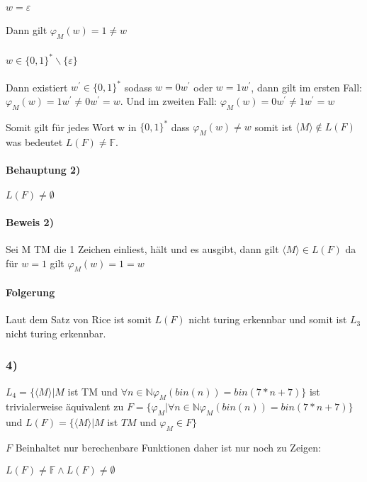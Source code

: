 \paragraph*{$w=\varepsilon$}
Dann gilt $\varphi_M(w)=1\neq w$ 
\paragraph*{$w \in \{0,1\}^* \backslash \{ \varepsilon \} $}
Dann existiert $w^{\prime} \in  \{0,1\}^*$ sodass $w=0w^{\prime}$ oder $w=1w^{\prime}$, dann gilt im ersten Fall: $\varphi_M(w)=1w^{\prime} \neq 0w^{\prime}=w$. Und im zweiten Fall: $\varphi_M(w)=0w^{\prime} \neq 1w^{\prime}=w$

Somit gilt für jedes Wort w in $\{0,1\}^*$ dass $\varphi_M(w) \neq w$ somit ist  $\langle M \rangle \notin L(F)$ was bedeutet $L(F) \neq \mathbb{F}$.

\paragraph*{Behauptung 2)}
$L(F) \neq \emptyset$

\paragraph*{Beweis 2)}

Sei M TM die 1 Zeichen einliest, hält und es ausgibt, dann gilt $\langle M \rangle \in L(F)$ da für $w=1$ gilt $\varphi_M(w)=1=w$

\paragraph*{Folgerung}

Laut dem Satz von Rice ist somit $L(F)$ nicht turing erkennbar und somit ist $L_3$ nicht turing erkennbar.


\subsubsection*{4)}
$L_4=\{\langle M \rangle | M$ ist TM und $\forall n \in \mathbb{N} \varphi_M(bin(n))=bin(7*n+7)\}$ ist trivialerweise äquivalent zu $F = \{ \varphi_M | \forall n \in \mathbb{N} \varphi_M(bin(n))=bin(7*n+7) \}$
und $L(F)=\{ \langle M \rangle | M$ ist $TM$ und $\varphi_M \in F \}$

$F$ Beinhaltet nur berechenbare Funktionen daher ist nur noch zu Zeigen:

$L(F) \neq \mathbb{F} \wedge L(F) \neq \emptyset $

